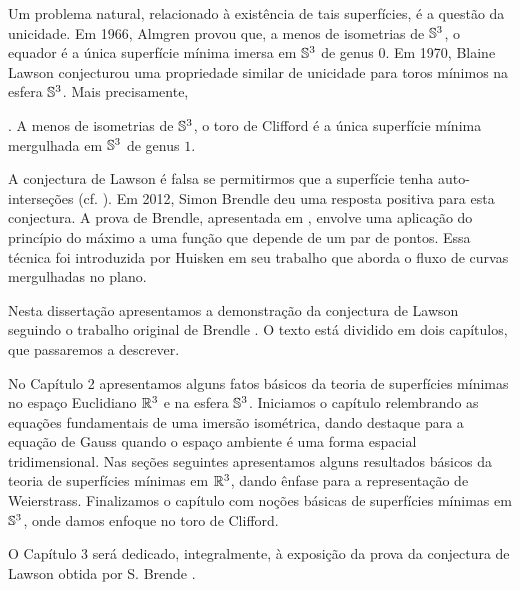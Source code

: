 Um problema natural, relacionado \`a exist\^encia de tais superf\'icies,
\'e a quest\~ao da unicidade. Em 1966, Almgren \cite{Almgren1966} 
provou que, a menos de isometrias de $\mathbb{S}^3$, o equador \'e a \'unica
superf\'icie m\'inima imersa em $\mathbb{S}^3$ de genus $0$.
Em 1970, Blaine Lawson \cite{Lawson1970a} conjecturou uma 
propriedade similar de unicidade para toros m\'inimos na esfera
$\mathbb{S}^3$. Mais precisamente,

\begin{conjectura}\label{teo:Lawson}
	\cite{Lawson1970a}. A menos de isometrias de $\mathbb{S}^3$, o toro de Clifford \'e a \'unica 
	superf\'icie m\'inima mergulhada em $\mathbb{S}^3$ de genus $1$.
\end{conjectura}

A conjectura de Lawson \'e falsa se permitirmos que a superf\'icie
tenha auto-interse\c c\~oes (cf. \cite{Lawson1969}). Em 2012, 
Simon Brendle deu uma resposta positiva para esta conjectura. 
A prova de Brendle, apresentada em \cite{Brendle2013a}, envolve
uma aplica\c c\~ao do princ\'ipio do m\'aximo a uma fun\c c\~ao 
que depende de um par de pontos. Essa t\'ecnica foi introduzida
por Huisken \cite{Huisken1998} em seu trabalho que aborda o 
fluxo de curvas mergulhadas no plano.

Nesta disserta\c c\~ao  apresentamos a 
demonstra\c c\~ao da conjectura de Lawson seguindo
o trabalho original de Brendle \cite{Brendle2013a}. O texto est\'a dividido em dois
cap\'itulos, que passaremos a descrever.

No Cap\'itulo 2 apresentamos alguns fatos b\'asicos da
teoria de superf\'icies m\'inimas no espa\c co Euclidiano
$\mathbb{R}^3$ e na esfera $\mathbb{S}^3$. Iniciamos o cap\'itulo 
relembrando as equa\c c\~oes fundamentais de uma 
imers\~ao isom\'etrica, dando destaque para a equa\c c\~ao
de Gauss quando o espa\c co ambiente \'e uma forma 
espacial tridimensional. Nas se\c c\~oes seguintes 
apresentamos alguns resultados b\'asicos da teoria de
superf\'icies m\'inimas em $\mathbb{R}^3$, dando \^enfase para
a representa\c c\~ao de Weierstrass. Finalizamos o
cap\'itulo com no\c c\~oes b\'asicas de superf\'icies 
m\'inimas em $\mathbb{S}^3$, onde damos enfoque no toro de
Clifford.

O Cap\'itulo 3 ser\'a dedicado, integralmente, \`a exposi\c c\~ao
da prova da conjectura de Lawson obtida por S. Brende
\cite{Brendle2013a}.
